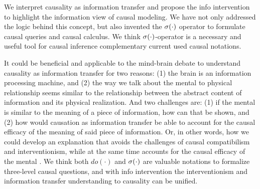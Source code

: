 We interpret causality as information transfer and propose the info intervention to highlight the information view of causal modeling. We have not only addressed the logic behind this concept, but also invented the $\mathrm{\sigma}(\cdot)$ operator to formulate causal queries and causal calculus. We think $\mathrm{\sigma}(\cdot)$-operator is a necessary and useful tool for causal inference complementary current used causal notations.

It could be beneficial and applicable to the mind-brain debate to understand causality as information transfer for two reasons:  (1) the brain is an information processing machine, and (2) the way we talk about the mental to physical relationship seems similar to the relationship between the abstract content of information and its physical realization. And two challenges are: (1) if the mental is similar to the meaning of a piece of information, how can that be shown, and (2) how would causation as information transfer be able to account for the causal efficacy of the meaning of said piece of information. Or, in other words, how we could develop an explanation that avoids the challenges of causal compatibilism and interventionism, while at the same time accounts for the causal efficacy of the mental \cite{feltz2019free}. We think both $do(\cdot)$ and $\mathrm{\sigma}(\cdot)$ are valuable notations to formalize three-level causal questions, and with info intervention the interventionism and information transfer understanding to causality can be unified.
